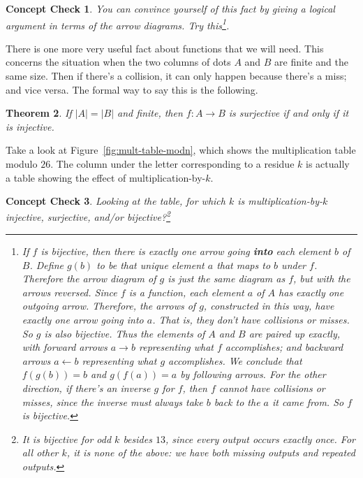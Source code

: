 \documentclass{article}
\theoremstyle{plain}
\newtheorem{theorem}{Theorem}
\newtheorem{checkin}[theorem]{Concept Check}
\theoremstyle{definition}
\theoremstyle{remark}
\numberwithin{theorem}{section}
\begin{document}
\begin{checkin}
  You can convince yourself of this fact by giving a logical argument in terms of the arrow diagrams.  Try this\footnote{If $f$ is bijective, then there is exactly one arrow going \textbf{into} each element $b$ of $B$.  Define $g(b)$ to be that unique element $a$ that maps to $b$ under $f$.  Therefore the arrow diagram of $g$ is just the same diagram as $f$, but with the arrows reversed.  Since $f$ is a function, each element $a$ of $A$ has exactly one outgoing arrow.  Therefore, the arrows of $g$, constructed in this way, have exactly one arrow going into $a$.  That is, they don't have collisions or misses.  So $g$ is also bijective.  Thus the elements of $A$ and $B$ are paired up exactly, with forward arrows $a \rightarrow b$ representing what $f$ accomplishes; and backward arrows $a \leftarrow b$ representing what $g$ accomplishes.  We conclude that $f(g(b))=b$ and $g(f(a))=a$ by following arrows.  For the other direction, if there's an inverse $g$ for $f$, then $f$ cannot have collisions or misses, since the inverse must always take $b$ back to the $a$ it came from.  So $f$ is bijective.}.
\end{checkin}

There is one more very useful fact about functions that we will need.  This concerns the situation when the two columns of dots $A$ and $B$ are finite and the same size.  Then if there's a collision, it can only happen because there's a miss; and vice versa.  The formal way to say this is the following.

\begin{theorem}
    If $|A| = |B|$ and finite, then $f: A \rightarrow B$ is surjective if and only if it is injective.
\end{theorem}

Take a look at Figure~\ref{fig:mult-table-modn}, which shows the multiplication table modulo $26$.  The column under the letter corresponding to a residue $k$ is actually a table showing the effect of multiplication-by-$k$.

\begin{checkin}
  Looking at the table, for which $k$ is multiplication-by-$k$ injective, surjective, and/or bijective?\footnote{It is bijective for odd $k$ besides $13$, since every output occurs exactly once.  For all other $k$, it is none of the above:  we have both missing outputs and repeated outputs.}
\end{checkin}
\end{document}
